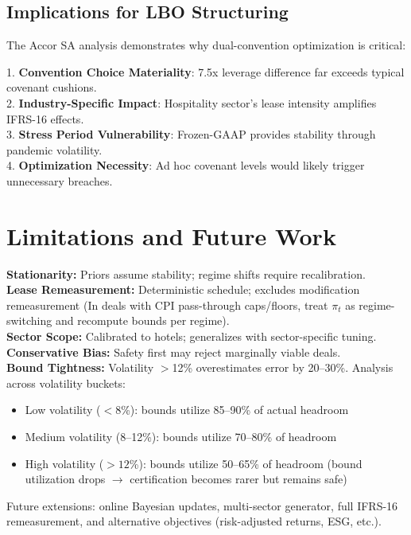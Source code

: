 \documentclass[11pt,a4paper]{article}
\theoremstyle{plain}
\theoremstyle{definition}
\begin{document}
\subsection{Implications for LBO Structuring}

The Accor SA analysis demonstrates why dual-convention optimization is critical:

1. \textbf{Convention Choice Materiality}: 7.5x leverage difference far exceeds typical covenant cushions. \\
2. \textbf{Industry-Specific Impact}: Hospitality sector's lease intensity amplifies IFRS-16 effects. \\
3. \textbf{Stress Period Vulnerability}: Frozen-GAAP provides stability through pandemic volatility. \\
4. \textbf{Optimization Necessity}: Ad hoc covenant levels would likely trigger unnecessary breaches.

\section{Limitations and Future Work}

\textbf{Stationarity:} Priors assume stability; regime shifts require recalibration. \\
\textbf{Lease Remeasurement:} Deterministic schedule; excludes modification remeasurement (In deals with CPI pass-through caps/floors, treat $\pi_t$ as regime-switching and recompute bounds per regime). \\
\textbf{Sector Scope:} Calibrated to hotels; generalizes with sector-specific tuning. \\
\textbf{Conservative Bias:} Safety first may reject marginally viable deals. \\
\textbf{Bound Tightness:} Volatility $>$12\% overestimates error by 20--30\%. Analysis across volatility buckets: 
\begin{itemize}
\item Low volatility ($<8$\%): bounds utilize 85--90\% of actual headroom
\item Medium volatility (8--12\%): bounds utilize 70--80\% of headroom  
\item High volatility ($>12$\%): bounds utilize 50--65\% of headroom (bound utilization drops $\to$ certification becomes rarer but remains safe)
\end{itemize}

Future extensions: online Bayesian updates, multi-sector generator, full IFRS-16 remeasurement, and alternative objectives (risk-adjusted returns, ESG, etc.).
\end{document}
